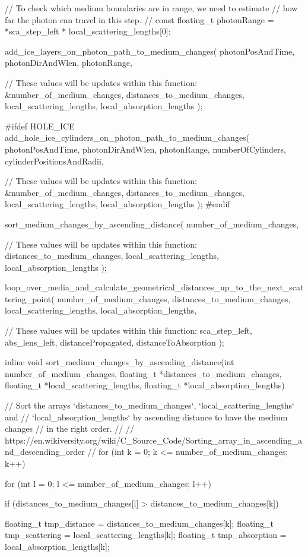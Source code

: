 \begin{ccode}
{  // To check which medium boundaries are in range, we need to estimate
  // how far the photon can travel in this step.
  //
  const floating_t photonRange = *sca_step_left * local_scattering_lengths[0];

  add_ice_layers_on_photon_path_to_medium_changes(
    photonPosAndTime,
    photonDirAndWlen,
    photonRange,

    // These values will be updates within this function:
    &number_of_medium_changes,
    distances_to_medium_changes,
    local_scattering_lengths,
    local_absorption_lengths
  );

  #ifdef HOLE_ICE
    add_hole_ice_cylinders_on_photon_path_to_medium_changes(
      photonPosAndTime,
      photonDirAndWlen,
      photonRange,
      numberOfCylinders,
      cylinderPositionsAndRadii,

      // These values will be updates within this function:
      &number_of_medium_changes,
      distances_to_medium_changes,
      local_scattering_lengths,
      local_absorption_lengths
    );
  #endif

  sort_medium_changes_by_ascending_distance(
    number_of_medium_changes,

    // These values will be updates within this function:
    distances_to_medium_changes,
    local_scattering_lengths,
    local_absorption_lengths
  );

  loop_over_media_and_calculate_geometrical_distances_up_to_the_next_scattering_point(
    number_of_medium_changes,
    distances_to_medium_changes,
    local_scattering_lengths,
    local_absorption_lengths,

    // These values will be updates within this function:
    sca_step_left,
    abs_lens_left,
    distancePropagated,
    distanceToAbsorption
  );
}

inline void sort_medium_changes_by_ascending_distance(int number_of_medium_changes, floating_t *distances_to_medium_changes, floating_t *local_scattering_lengths, floating_t *local_absorption_lengths)
{
  // Sort the arrays `distances_to_medium_changes`, `local_scattering_lengths` and
  // `local_absorption_lengths` by ascending distance to have the medium changes
  // in the right order.
  //
  // https://en.wikiversity.org/wiki/C_Source_Code/Sorting_array_in_ascending_and_descending_order
  //
  for (int k = 0; k <= number_of_medium_changes; k++) {
    for (int l = 0; l <= number_of_medium_changes; l++) {
      if (distances_to_medium_changes[l] > distances_to_medium_changes[k]) {
        floating_t tmp_distance = distances_to_medium_changes[k];
        floating_t tmp_scattering = local_scattering_lengths[k];
        floating_t tmp_absorption = local_absorption_lengths[k];

}}}}
\end{ccode}
